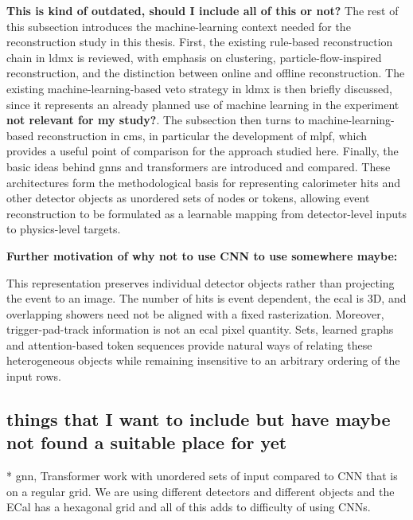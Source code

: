 \textbf{This is kind of outdated, should I include all of this or not?} The rest of this subsection introduces the machine-learning context needed for the reconstruction study in this thesis. First, the existing rule-based reconstruction chain in \gls{ldmx} is reviewed, with emphasis on clustering, particle-flow-inspired reconstruction, and the distinction between online and offline reconstruction. The existing machine-learning-based veto strategy in \gls{ldmx} is then briefly discussed, since it represents an already planned use of machine learning in the experiment \textbf{not relevant for my study?}. The subsection then turns to machine-learning-based reconstruction in \gls{cms}, in particular the development of \gls{mlpf}, which provides a useful point of comparison for the approach studied here. Finally, the basic ideas behind \glspl{gnn} and transformers are introduced and compared. These architectures form the methodological basis for representing calorimeter hits and other detector objects as unordered sets of nodes or tokens, allowing event reconstruction to be formulated as a learnable mapping from detector-level inputs to physics-level targets.

\textbf{Further motivation of why not to use CNN to use somewhere maybe:}

This representation preserves individual detector objects rather than
projecting the event to an image. The number of hits is event dependent, the
\gls{ecal} is 3D, and overlapping showers need not be aligned
with a fixed rasterization. Moreover, trigger-pad-track information is not an
\gls{ecal} pixel quantity. Sets, learned graphs and attention-based token
sequences provide natural ways of relating these heterogeneous objects while
remaining insensitive to an arbitrary ordering of the input rows.















\subsection{things that I want to include but have maybe not found a suitable place for yet}

* \gls{gnn}, Transformer work with unordered sets of input compared to CNN that is on a regular grid. We are using different detectors and different objects and the ECal has a hexagonal grid and all of this adds to difficulty of using CNNs. 

